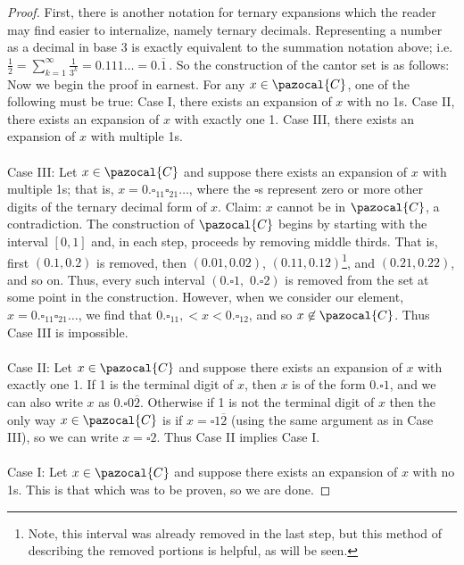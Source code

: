 \documentclass[letterpaper]{article}
\renewcommand{\mathcal}[1]{\pazocal{#1}}
\begin{document}
\begin{enumerate}
\begin{enumerate}
		\begin{proof}
		First, there is another notation for ternary expansions which the reader may find easier to internalize, namely ternary decimals. Representing a number as a decimal in base 3 is exactly equivalent to the summation notation above; i.e. $\frac{1}{2}=\sum_{k=1}^{\infty}\frac{1}{3^k}=0.111\ldots = 0.\overline{1}$\,. So the construction of the cantor set is as follows:
		Now we begin the proof in earnest. For any $x\in \mathcal C$, one of the following must be true: Case I, there exists an expansion of $x$ with no 1s. Case II, there exists an expansion of $x$ with exactly one 1. Case III, there exists an expansion of $x$ with multiple 1s. \\
		\mbox{}\\
		Case III: Let $x\in \mathcal C$ and suppose there exists an expansion of $x$ with multiple 1s; that is, $x=0.\square_11\square_21\ldots$, where the $\square$s represent zero or more other digits of the ternary decimal form of $x$. Claim: $x$ cannot be in $\mathcal{C}$, a contradiction. The construction of $\mathcal{C}$ begins by starting with the interval $[0,1]$ and, in each step, proceeds by removing middle thirds. That is, first $(0.1, 0.2)$ is removed, then $(0.01, 0.02)$, $(0.11, 0.12)$\footnote{Note, this interval was already removed in the last step, but this method of describing the removed portions is helpful, as will be seen.}, and $(0.21, 0.22)$, and so on. Thus, every such interval $(0.\square1, \,\, 0.\square2)$ is removed from the set at some point in the construction. However, when we consider our element, $x=0.\square_11\square_21\ldots$, we find that $0.\square_11, < x < 0.\square_12$, and so $x\not\in\mathcal{C}$. Thus Case III is impossible. \\
		\mbox{}\\
		Case II: Let $x\in \mathcal C$ and suppose there exists an expansion of $x$ with exactly one 1. If 1 is the terminal digit of $x$, then $x$ is of the form $0.\square1$, and we can also write $x$ as $0.\square0\overline 2$. Otherwise if 1 is not the terminal digit of $x$ then the only way $x\in\mathcal C$ is if $x=\square1\overline 2$ (using the same argument as in Case III), so we can write $x=\square2$. Thus Case II implies Case I. \\
		\mbox{}\\
		Case I: Let $x\in \mathcal C$ and suppose there exists an expansion of $x$ with no 1s. This is that which was to be proven, so we are done.


\end{proof}
\end{enumerate}
\end{enumerate}
\end{document}
